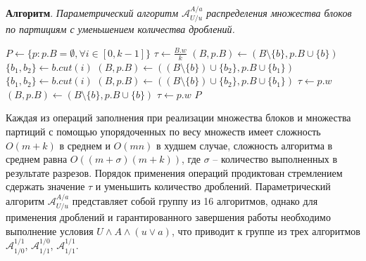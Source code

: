 \documentclass[a4paper,14pt]{extarticle}                     %
\theoremstyle{plain}                                         %
\begin{document}
\textbf{Алгоритм}. \textit{Параметрический алгоритм $\mathscr{A}_{U/u}^{A/a}$ распределения множества блоков по партициям с уменьшением количества дроблений.}
\begin{algorithm}
\DontPrintSemicolon
{}
{
	$P \leftarrow \{ p : p.B = \emptyset, \forall i \in [0, k - 1] \}$\;
	$\tau \leftarrow \frac{B.w}{k}$\;
	{
		{
			$(B, p.B) \leftarrow (B \setminus \{b\}, p.B \cup \{b\})$\;
			\Continue\;
		}
		{
			$\{ b_1, b_2 \} \leftarrow b.cut(i)$\;
			$(B, p.B) \leftarrow ((B \setminus \{ b \}) \cup \{ b_2 \}, p.B \cup \{ b_1 \})$\;
			\Continue\;
		}
		{
			$\{ b_1, b_2 \} \leftarrow b.cut(i)$\;
			$(B, p.B) \leftarrow ((B \setminus \{ b \}) \cup \{ b_2 \}, p.B \cup \{ b_1 \})$\;
			$\tau \leftarrow p.w$\;
			\Continue\;
		}
		{
			$(B, p.B) \leftarrow (B \setminus \{b\}, p.B \cup \{b\})$\;
			$\tau \leftarrow p.w$\;
			\Continue\;
		}
	}
	\KwRet $P$\;
}
\end{algorithm}

Каждая из операций заполнения при реализации множества блоков и множества партиций с помощью упорядоченных по весу множеств имеет сложность $O(m + k)$ в среднем и $O(mn)$ в худшем случае, сложность алгоритма в среднем равна $O((m + \sigma)(m + k))$, где $\sigma$ -- количество выполненных в результате разрезов.
Порядок применения операций продиктован стремлением сдержать значение $\tau$ и уменьшить количество дроблений.
Параметрический алгоритм $\mathscr{A}_{U/u}^{A/a}$ представляет собой группу из 16 алгоритмов, однако для применения дроблений и гарантированного завершения работы необходимо выполнение условия $U \wedge A \wedge (u \vee a)$, что приводит к группе из трех алгоритмов $\mathscr{A}_{1/0}^{1/1}$, $\mathscr{A}_{1/1}^{1/0}$, $\mathscr{A}_{1/1}^{1/1}$.
\end{document}
